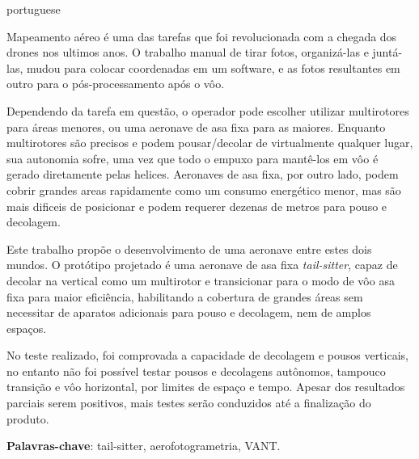 
\setlength{\absparsep}{18pt} %
\begin{resumo}[Resumo]
 \begin{otherlanguage*}{portuguese}

Mapeamento aéreo é uma das tarefas que foi revolucionada com a chegada dos drones nos ultimos anos.
%
O trabalho manual de tirar fotos, organizá-las e juntá-las, mudou para colocar coordenadas em um software, e as fotos resultantes em outro para o pós-processamento após o vôo.
%

Dependendo da tarefa em questão, o operador pode escolher utilizar multirotores para áreas menores, ou uma aeronave de asa fixa para as maiores.
%
Enquanto multirotores são precisos e podem pousar/decolar de virtualmente qualquer lugar, sua autonomia sofre, uma vez que todo o empuxo para mantê-los em vôo é gerado diretamente pelas helices.
%
Aeronaves de asa fixa, por outro lado, podem cobrir grandes areas rapidamente como um consumo energético menor, mas são mais dificeis de posicionar e podem requerer dezenas de metros para pouso e decolagem.

%
Este trabalho propõe o desenvolvimento de uma aeronave entre estes dois mundos.
%
O protótipo projetado é uma aeronave de asa fixa \textit{tail-sitter}, capaz de decolar na vertical como um multirotor e transicionar para o modo de vôo asa fixa para maior eficiência, habilitando a cobertura de grandes áreas sem necessitar de aparatos adicionais para pouso e decolagem, nem de amplos espaços.
%

No teste realizado, foi comprovada a capacidade de decolagem e pousos verticais, no entanto não foi possível testar pousos e decolagens autônomos, tampouco transição e vôo horizontal, por limites de espaço e tempo. Apesar dos resultados parciais serem positivos, mais testes serão conduzidos até a finalização do produto.
%


 \textbf{Palavras-chave}: tail-sitter, aerofotogrametria, VANT.
  \end{otherlanguage*}
\end{resumo}

